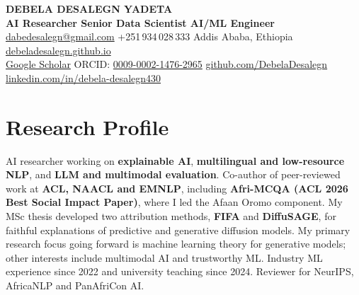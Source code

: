 \documentclass[10pt,a4paper]{article}
\begin{document}
{\fontsize{24}{26}\selectfont\bfseries DEBELA DESALEGN YADETA}\\[3pt]
{\large\bfseries\color{accent} AI Researcher \textbar{} Senior Data Scientist \textbar{} AI/ML Engineer}\\[4pt]
{\small\color{muted}
\href{mailto:dabedesalegn@gmail.com}{dabedesalegn@gmail.com} \quad +251\,934\,028\,333 \quad Addis Ababa, Ethiopia \quad
\href{https://debeladesalegn.github.io}{debeladesalegn.github.io}\\
\href{https://scholar.google.com/citations?user=a272tZcAAAAJ}{Google Scholar} \quad
ORCID: \href{https://orcid.org/0009-0002-1476-2965}{0009-0002-1476-2965} \quad
\href{https://github.com/DebelaDesalegn}{github.com/DebelaDesalegn} \quad
\href{https://www.linkedin.com/in/debela-desalegn430}{linkedin.com/in/debela-desalegn430}}

\section{Research Profile}
AI researcher working on \textbf{explainable AI}, \textbf{multilingual and low-resource NLP}, and \textbf{LLM and multimodal evaluation}. Co-author of peer-reviewed work at \textbf{ACL, NAACL and EMNLP}, including \textbf{Afri-MCQA (ACL 2026 Best Social Impact Paper)}, where I led the Afaan Oromo component. My MSc thesis developed two attribution methods, \textbf{FIFA} and \textbf{DiffuSAGE}, for faithful explanations of predictive and generative diffusion models. My primary research focus going forward is machine learning theory for generative models; other interests include multimodal AI and trustworthy ML. Industry ML experience since 2022 and university teaching since 2024. Reviewer for NeurIPS, AfricaNLP and PanAfriCon AI.
\end{document}
